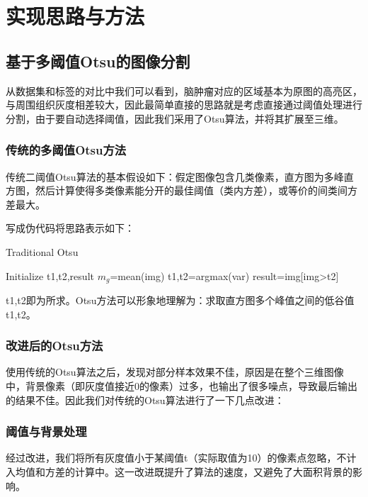 \documentclass[UTF8]{ctexart}
\begin{document}
\section{实现思路与方法}
\subsection{基于多阈值Otsu的图像分割}
从数据集和标签的对比中我们可以看到，脑肿瘤对应的区域基本为原图的高亮区，与周围组织灰度相差较大，因此最简单直接的思路就是考虑直接通过阈值处理进行分割，由于要自动选择阈值，因此我们采用了Otsu算法，并将其扩展至三维。

\subsubsection{传统的多阈值Otsu方法}
传统二阈值Otsu算法的基本假设如下：假定图像包含几类像素，直方图为多峰直方图，然后计算使得多类像素能分开的最佳阈值（类内方差），或等价的间类间方差最大。

写成伪代码将思路表示如下：

\begin{algorithm}[H]
    \caption{Traditional Otsu}\label{algorithm}
        Initialize t1,t2,result\;
        $m_g$=mean(img)\;
        t1,t2=argmax(var)\;
        result=img[img>t2]\;
        
\end{algorithm}

	t1,t2即为所求。Otsu方法可以形象地理解为：求取直方图多个峰值之间的低谷值t1,t2。
\subsubsection{改进后的Otsu方法}
使用传统的Otsu算法之后，发现对部分样本效果不佳，原因是在整个三维图像中，背景像素（即灰度值接近0的像素）过多，也输出了很多噪点，导致最后输出的结果不佳。因此我们对传统的Otsu算法进行了一下几点改进：
\subsubsection*{阈值与背景处理}
经过改进，我们将所有灰度值小于某阈值t（实际取值为10）的像素点忽略，不计入均值和方差的计算中。这一改进既提升了算法的速度，又避免了大面积背景的影响。
\end{document}
